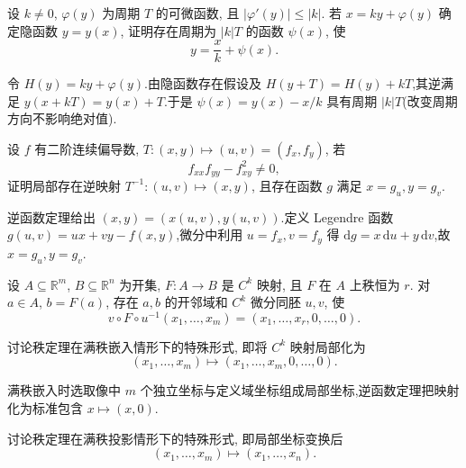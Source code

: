 \begin{example}
    设 $k\ne0$, $\varphi(y)$ 为周期 $T$ 的可微函数, 且 $|\varphi'(y)|\leq|k|$. 若 $x=ky+\varphi(y)$ 确定隐函数 $y=y(x)$, 证明存在周期为 $|k|T$ 的函数 $\psi(x)$, 使
    \[
        y=\dfrac{x}{k}+\psi(x).
    \]
\end{example}
\exampleblank

\begin{solution}
    令 $H(y)=ky+\varphi(y)$.由隐函数存在假设及 $H(y+T)=H(y)+kT$,其逆满足 $y(x+kT)=y(x)+T$.于是 $\psi(x)=y(x)-x/k$ 具有周期 $|k|T$(改变周期方向不影响绝对值).
\end{solution}

\begin{example}
    设 $f$ 有二阶连续偏导数, $T:(x,y)\mapsto(u,v)=(f_x,f_y)$, 若
    \[
        f_{xx}f_{yy}-f_{xy}^2\ne0,
    \]
    证明局部存在逆映射 $T^{-1}:(u,v)\mapsto(x,y)$, 且存在函数 $g$ 满足 $x=g_u,y=g_v$.
\end{example}
\exampleblank

\begin{solution}
    逆函数定理给出 $(x,y)=(x(u,v),y(u,v))$.定义 Legendre 函数
    $g(u,v)=ux+vy-f(x,y)$,微分中利用 $u=f_x,v=f_y$ 得 $\mathrm dg=x\,\mathrm du+y\,\mathrm dv$,故 $x=g_u,y=g_v$.
\end{solution}




\begin{theorem}
    设 $A\subseteq\mathbb{R}^m$, $B\subseteq\mathbb{R}^n$ 为开集, $F:A\to B$ 是 $C^k$ 映射, 且 $F$ 在 $A$ 上秩恒为 $r$. 对 $a\in A$, $b=F(a)$, 存在 $a,b$ 的开邻域和 $C^k$ 微分同胚 $u,v$, 使
    \[
        v\circ F\circ u^{-1}(x_1,\ldots,x_m)
        =(x_1,\ldots,x_r,0,\ldots,0).
    \]
\end{theorem}

\begin{example}
    讨论秩定理在满秩嵌入情形下的特殊形式, 即将 $C^k$ 映射局部化为
    \[
        (x_1,\ldots,x_m)\mapsto(x_1,\ldots,x_m,0,\ldots,0).
    \]
\end{example}
\exampleblank

\begin{solution}
    满秩嵌入时选取像中 $m$ 个独立坐标与定义域坐标组成局部坐标,逆函数定理把映射化为标准包含 $x\mapsto(x,0)$.
\end{solution}

\begin{example}
    讨论秩定理在满秩投影情形下的特殊形式, 即局部坐标变换后
    \[
        (x_1,\ldots,x_m)\mapsto(x_1,\ldots,x_n).
    \]
\end{example}
\exampleblank

